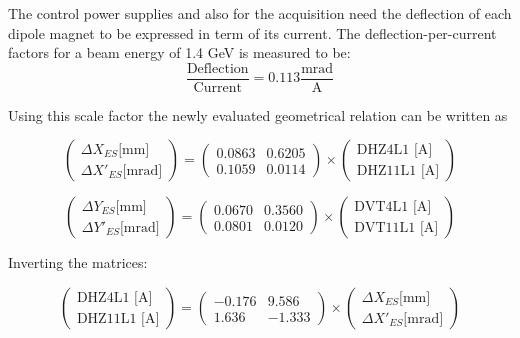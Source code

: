\documentclass[11pt,letter,english]{article}
\begin{document}
The control power supplies and also for the acquisition need the deflection of
each dipole magnet to be expressed in term of its current.
The deflection-per-current factors for a beam energy of 1.4 GeV is measured to be:
\begin{equation}
\frac{\mbox{Deflection}}{\mbox{Current}} = 0.113 \frac{\mbox{mrad}}{\mbox{A}}
\end{equation}

Using this scale factor the newly evaluated geometrical relation can be written as 

\begin{equation}
\left( \begin{array}{c}
\Delta X_{ES}  \mbox{[mm]}   \\
\Delta X'_{ES} \mbox{[mrad]} \end{array} \right) 
=
\left( \begin{array}{cc}
0.0863 & 0.6205   \\
0.1059 & 0.0114  \end{array} \right) 
\times
\left( \begin{array}{c}
\mbox{DHZ4L1 [A]}   \\
\mbox{DHZ11L1 [A]}  \end{array} \right) 
\end{equation}

\begin{equation}
\left( \begin{array}{c}
\Delta Y_{ES}  \mbox{[mm]}   \\
\Delta Y'_{ES} \mbox{[mrad]} \end{array} \right) 
=
\left( \begin{array}{cc}
0.0670 & 0.3560  \\
0.0801 & 0.0120 \end{array} \right) 
\times
\left( \begin{array}{c}
\mbox{DVT4L1 [A]}   \\
\mbox{DVT11L1 [A]}  \end{array} \right) 
\end{equation}

Inverting the matrices:

\begin{equation}
\left( \begin{array}{c}
\mbox{DHZ4L1 [A]}   \\
\mbox{DHZ11L1 [A]}  \end{array} \right) 
=
\left( \begin{array}{cc}
-0.176  &  9.586 \\                  
  1.636 & -1.333 \end{array} \right) 
\times
\left( \begin{array}{c}
\Delta X_{ES}  \mbox{[mm]}   \\
\Delta X'_{ES} \mbox{[mrad]} \end{array} \right) 
\end{equation}
\end{document}
